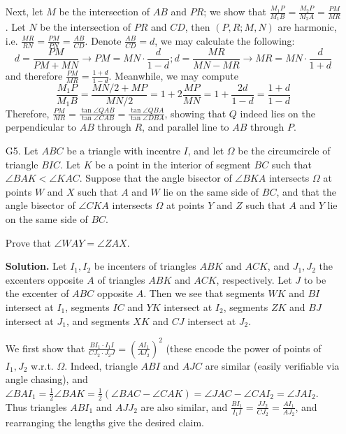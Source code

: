 \documentclass[11pt,a4paper]{article}
\begin{document}
\begin{enumerate}
    	Next, let $M$ be the intersection of $AB$ and $PR$; 
    	we show that $\frac{M_1P}{M_1B}=\frac{M_2P}{M_2A}=\frac{PM}{MR}$. 
    	Let $N$ be the intersection of $PR$ and $CD$, 
    	then $(P, R; M, N)$ are harmonic, 
    	i.e. $\frac{MR}{RN}=\frac{PM}{PN}=\frac{AB}{CD}$. 
    	Denote $\frac{AB}{CD}=d$, we may calculate the following: 
    	\[
    	d=\frac{PM}{PM+MN}\to PM=MN\cdot \frac{d}{1-d}; 
    	d=\frac{MR}{MN-MR}\to MR = MN\cdot \frac{d}{1+d}
    	\]
    	and therefore $\frac{PM}{MR}=\frac{1+d}{1-d}$. 
    	Meanwhile, we may compute 
    	\[
    	\frac{M_1P}{M_1B}
    	=\frac{MN/2+MP}{MN/2}
    	=1+2\frac{MP}{MN}
    	=1+\frac{2d}{1-d}
    	=\frac{1+d}{1-d}
    	\]
    	Therefore, 
    	$\frac{PM}{MR}=\frac{\tan\angle QAB}{\tan\angle CAB}=\frac{\tan\angle QBA}{\tan\angle DBA}$, 
    	showing that $Q$ indeed lies on the perpendicular to $AB$ through $R$, 
    	and parallel line to $AB$ through $P$. 
    	
    	\item [G5.] 
    	Let $ABC$ be a triangle with incentre $I$, and let $\Omega$ be the circumcircle of triangle $BIC$. Let $K$ be a point in the interior of segment $BC$ such that $\angle BAK < \angle KAC$. Suppose that the angle bisector of $\angle BKA$ intersects $\Omega$ at points $W$ and $X$ such that $A$ and $W$ lie on the same side of $BC$, and that the angle bisector of $\angle CKA$ intersects $\Omega$ at points $Y$ and $Z$ such that $A$ and $Y$ lie on the same side of $BC$.
    	
    	Prove that $\angle WAY = \angle ZAX$.
    	
    	\textbf{Solution.} Let $I_1, I_2$ be incenters of triangles $ABK$ and $ACK$, 
    	and $J_1, J_2$ the excenters opposite $A$ of triangles $ABK$ and $ACK$, 
    	respectively. 
    	Let $J$ to be the excenter of $ABC$ opposite $A$. 
    	Then we see that segments $WK$ and $BI$ intersect at $I_1$, 
    	segments $IC$ and $YK$ intersect at $I_2$, 
    	segments $ZK$ and $BJ$ intersect at $J_1$, 
    	and segments $XK$ and $CJ$ intersect at $J_2$. 
    	
    	We first show that 
    	$\frac{BI_1\cdot I_1I}{CJ_2\cdot J_2J} = (\frac{AI_1}{AJ_2})^2$ (these encode the power of points of $I_1, J_2$ w.r.t. $\Omega$. 
    	Indeed, triangle $ABI$ and $AJC$ are similar (easily verifiable via angle chasing), 
    	and $\angle BAI_1 = \frac 12 \angle BAK = \frac 12 (\angle BAC - \angle CAK) = \angle JAC - \angle CAI_2 = \angle JAI_2$. 
    	Thus triangles $ABI_1$ and $AJJ_2$ are also similar, and 
    	$\frac{BI_1}{I_1I} = \frac{JJ_2}{CJ_2} = \frac{AI_1}{AJ_2}$, 
    	and rearranging the lengths give the desired claim. 
    	

\end{enumerate}
\end{document}
